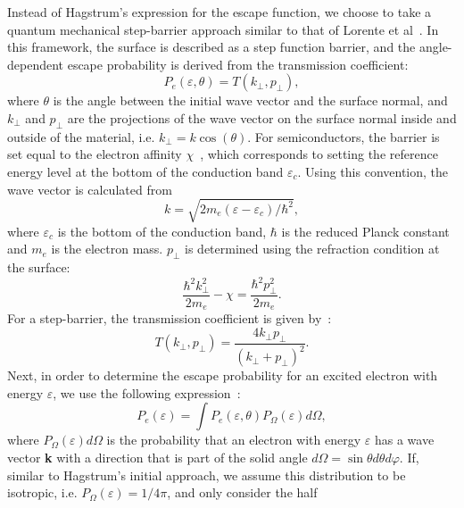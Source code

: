 \begin{refsection}
Instead of Hagstrum's expression for the escape function, we choose to take a 
quantum mechanical step-barrier approach similar to that of Lorente et 
al~\cite{Lorente1994}. In this framework, the surface is described as a step 
function barrier, and the angle-dependent escape probability is derived from 
the transmission coefficient: 
\begin{equation} 
P_e(\varepsilon, \theta) = T(k_\perp,p_\perp), 
\end{equation} 
where $\theta$ is the angle between the initial wave vector and the surface 
normal, and $k_\perp$ and $p_\perp$ are the projections of the wave vector on 
the surface normal inside and outside of the material, i.e. $k_\perp = k 
\cos(\theta)$. For semiconductors, the barrier is set equal to the electron 
affinity $\chi$~\cite{Baragiola1993, Aboelfotoh1977, Yoon2001}, which 
corresponds to setting the reference energy level at the bottom of the 
conduction band $\varepsilon_c$. Using this convention, the wave vector is 
calculated from 
\begin{equation}\label{quotas:eq-wavevector} 
k=\sqrt{2 m_e (\varepsilon - \varepsilon_c)/\hbar^2}, 
\end{equation} 
where $\varepsilon_c$ is the bottom of the conduction band, $\hbar$ is the 
reduced Planck constant and $m_e$ is the electron mass. $p_\perp$ is 
determined using the refraction condition at the surface: 
\begin{equation}\label{quotas:eq-refraction} 
\frac{\hbar^2 k_\perp^2}{2 m_e} - \chi = \frac{\hbar^2 p_\perp^2}{2 m_e}. 
\end{equation} 
For a step-barrier, the transmission coefficient is given 
by~\cite{Lorente1994}: 
\begin{equation} 
T(k_\perp,p_\perp) = \frac{4k_\perp p_\perp}{(k_\perp + p_\perp)^2}. 
\end{equation} 
Next, in order to determine the escape probability for an excited electron 
with energy $\varepsilon$, we use the following 
expression~\cite{Hagstrum1954}: 
\begin{equation} 
P_e(\varepsilon) = \int P_e(\varepsilon,\theta) P_{\Omega}(\varepsilon) 
d\Omega, 
\end{equation} 
where $P_{\Omega}(\varepsilon)d\Omega$ is the probability that an electron 
with energy $\varepsilon$ has a wave vector \textbf{k} with a direction that 
is part of the solid angle $d\Omega = \sin{\theta} d\theta d\varphi$. If, 
similar to Hagstrum's initial approach, we assume this distribution to be 
isotropic, i.e. $P_{\Omega}(\varepsilon) = 1/4\pi$, and only consider the half 

\end{refsection}
